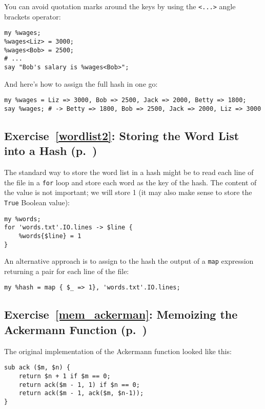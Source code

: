 You can avoid quotation marks around the keys by using 
the \verb'<...>' angle brackets operator:

\begin{verbatim}
my %wages;
%wages<Liz> = 3000;
%wages<Bob> = 2500;
# ...
say "Bob's salary is %wages<Bob>";
\end{verbatim}

And here's how to assign the full hash in one go:

\begin{verbatim}
my %wages = Liz => 3000, Bob => 2500, Jack => 2000, Betty => 1800;
say %wages; # -> Betty => 1800, Bob => 2500, Jack => 2000, Liz => 3000
\end{verbatim}

\subsection{Exercise~\ref{wordlist2}: Storing the Word List into a Hash (p.~\pageref{wordlist2})}
\label{sol_wordlist2}

The standard way to store the word list in a hash might 
be to read each line of the file in a {\tt for} loop 
and store each word as the key of the hash. The content 
of the value is not important; we will store 1 (it may 
also make sense to store the \verb'True' Boolean value):

\begin{verbatim}
my %words;
for 'words.txt'.IO.lines -> $line {
    %words{$line} = 1
}
\end{verbatim}

An alternative approach is to assign to the hash the 
output of a {\tt map} expression returning a pair for each 
line of the file:

\begin{verbatim}
my %hash = map { $_ => 1}, 'words.txt'.IO.lines;
\end{verbatim}
%

\subsection{Exercise~\ref{mem_ackerman}: Memoizing the Ackermann Function (p.~\pageref{mem_ackerman})}
\label{sol_mem_ackerman}

The original implementation of the Ackermann function looked 
like this:

\begin{verbatim}
sub ack ($m, $n) {
    return $n + 1 if $m == 0;
    return ack($m - 1, 1) if $n == 0;
    return ack($m - 1, ack($m, $n-1));
}
\end{verbatim}

